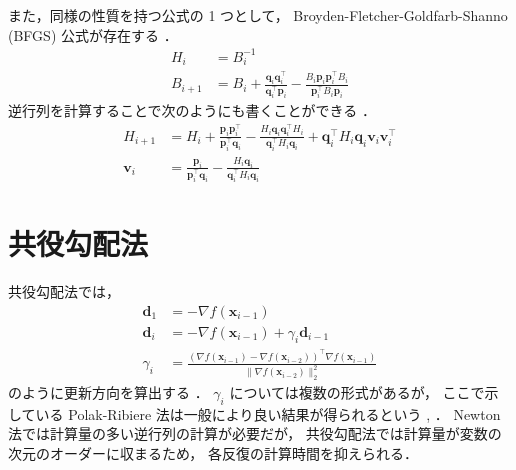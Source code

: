 また，同様の性質を持つ公式の 1 つとして，
Broyden-Fletcher-Goldfarb-Shanno (BFGS) 公式が存在する
\cite[Section 9.4]{Luenberger2003}．
\begin{align}
    H_i &= B_i^{-1} \\
    B_{i+1} &= B_i + \frac{\bm{q}_i \bm{q}_i^\top}{\bm{q}_i^\top \bm{p}_i}
        - \frac{B_i \bm{p}_i \bm{p}_i^\top B_i}{\bm{p}_i^\top B_i \bm{p}_i}
\end{align}
逆行列を計算することで次のようにも書くことができる
\cite[Section 10.9]{Press2007}．
\begin{align}
    H_{i+1} &= H_i + \frac{\bm{p}_i \bm{p}_i^\top}{\bm{p}_i^\top \bm{q}_i}
        - \frac{H_i \bm{q}_i \bm{q}_i^\top H_i}{\bm{q}_i^\top H_i \bm{q}_i}
        + \bm{q}_i^\top H_i \bm{q}_i \bm{v}_i \bm{v}_i^\top \\
    \bm{v}_i &= \frac{\bm{p}_i}{\bm{p}_i^\top \bm{q}_i}
        - \frac{H_i \bm{q}_i}{\bm{q}_i^\top H_i \bm{q}_i}
\end{align}

\section{共役勾配法}

共役勾配法では，
\begin{align}
    \bm{d}_1 &= -\nabla f(\bm{x}_{i-1}) \\
    \bm{d}_i &= -\nabla f(\bm{x}_{i-1}) + \gamma_i \bm{d}_{i-1} \\
    \gamma_i &=
        \frac{(\nabla f(\bm{x}_{i-1}) - \nabla f(\bm{x}_{i-2}))^\top \nabla f(\bm{x}_{i-1})}
        {\|\nabla f(\bm{x}_{i-2})\|_2^2}
\end{align}
のように更新方向を算出する
\cite[Section 8.6]{Luenberger2003}．
$\gamma_i$ については複数の形式があるが，
ここで示している Polak-Ribiere 法は一般により良い結果が得られるという
\cite[Section 8.6]{Luenberger2003}, \cite[Section 10.8]{Press2007}．
Newton 法では計算量の多い逆行列の計算が必要だが，
共役勾配法では計算量が変数の次元のオーダーに収まるため，
各反復の計算時間を抑えられる．
